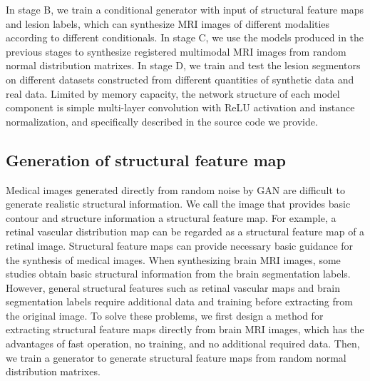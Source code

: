 \documentclass{ecai}
\begin{document}
In stage B, we train a conditional generator with input of structural feature maps and lesion labels, which can synthesize MRI images of different modalities according to different conditionals.
In stage C, we use the models produced in the previous stages to synthesize registered multimodal MRI images from random normal distribution matrixes. 
In stage D, we train and test the lesion segmentors on different datasets constructed from different quantities of synthetic data and real data.
Limited by memory capacity, the network structure of each model component is simple multi-layer convolution with ReLU activation and instance normalization, and specifically described in the source code we provide. 

\subsection{Generation of structural feature map}
Medical images generated directly from random noise by GAN are difficult to generate realistic structural information. We call the image that provides basic contour and structure information a structural feature map. For example, a retinal vascular distribution map can be regarded as a structural feature map of a retinal image\cite{41costa2017towards}. Structural feature maps can provide necessary basic guidance for the synthesis of medical images. When synthesizing brain MRI images, some studies obtain basic structural information from the brain segmentation labels\cite{4shin2018medical}. However, general structural features such as retinal vascular maps and brain segmentation labels require additional data and training before extracting from the original image. To solve these problems, we first design a method for extracting structural feature maps directly from brain MRI images, which has the advantages of fast operation, no training, and no additional required data. Then, we train a generator to generate structural feature maps from random normal distribution matrixes.
\end{document}
